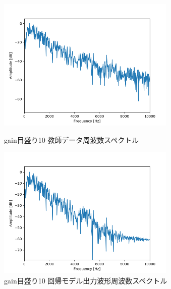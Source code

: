 \documentclass{jreport}		%
\begin{document}
\newpage
\begin{figure}[htbp]
 \begin{minipage}{0.5\hsize}
  \begin{center}
   \includegraphics[width=85mm]{gain10_fft.png}
  \end{center}
  \caption{gain目盛り10 教師データ周波数スペクトル}
  \label{fig:one}
 \end{minipage}
 \begin{minipage}{0.5\hsize}
  \begin{center}
   \includegraphics[width=85mm]{gain10_predict_fft.png}
  \end{center}
  \caption{gain目盛り10 回帰モデル出力波形周波数スペクトル}
  \label{fig:two}
 \end{minipage}
\end{figure}
\end{document}
